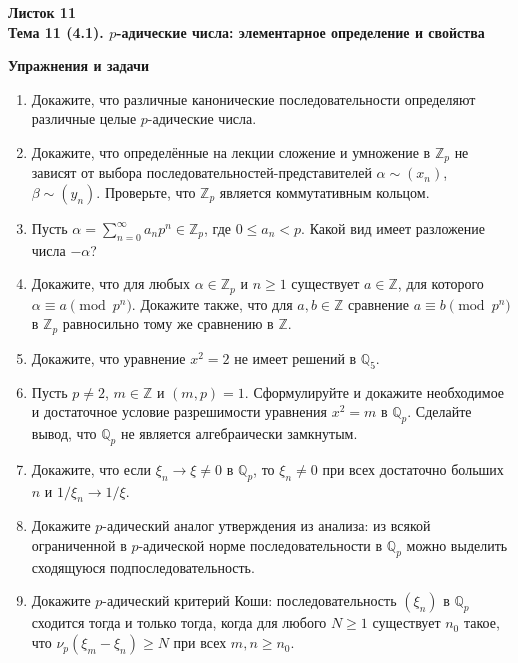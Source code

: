 \documentclass[a4paper, 11pt]{article}
\begin{document}
\begin{center} \Large\bfseries Листок 11\\ Тема 11 (4.1). $p$-адические числа: элементарное определение и свойства \end{center}

\noindent\textbf{Упражнения и задачи}

\begin{enumerate}[topsep=0pt]

    \item Докажите, что различные канонические последовательности определяют различные целые $p$-адические числа. %

    \item Докажите, что определённые на лекции сложение и умножение в $\mathbb{Z}_p$ не зависят от выбора последовательностей-представителей $\alpha\sim(x_n)$, $\beta\sim(y_n)$. Проверьте, что $\mathbb{Z}_p$ является коммутативным кольцом. %

    \item Пусть $\alpha = \sum_{n=0}^{\infty} a_n p^n \in \mathbb{Z}_p$, где $0\le a_n<p$. Какой вид имеет разложение числа $-\alpha$? %

    \item Докажите, что для любых $\alpha\in\mathbb{Z}_p$ и $n\ge 1$ существует $a\in\mathbb{Z}$, для которого $\alpha\equiv a\pmod{p^n}$. Докажите также, что для $a,b\in\mathbb{Z}$ сравнение $a\equiv b\pmod{p^n}$ в $\mathbb{Z}_p$ равносильно тому же сравнению в $\mathbb{Z}$. %

    \item Докажите, что уравнение $x^2=2$ не имеет решений в $\mathbb{Q}_5$.

    \item Пусть $p\neq 2$, $m\in\mathbb{Z}$ и $(m,p)=1$. Сформулируйте и докажите необходимое и достаточное условие разрешимости уравнения $x^2=m$ в $\mathbb{Q}_p$. Сделайте вывод, что $\mathbb{Q}_p$ не является алгебраически замкнутым.

    \item Докажите, что если $\xi_n\to\xi\neq 0$ в $\mathbb{Q}_p$, то $\xi_n\neq 0$ при всех достаточно больших $n$ и $1/\xi_n\to 1/\xi$. %

    \item Докажите $p$-адический аналог утверждения из анализа: из всякой ограниченной в $p$-адической норме последовательности в $\mathbb{Q}_p$ можно выделить сходящуюся подпоследовательность. %

    \item Докажите $p$-адический критерий Коши: последовательность $(\xi_n)$ в $\mathbb{Q}_p$ сходится тогда и только тогда, когда для любого $N\ge 1$ существует $n_0$ такое, что $\nu_p(\xi_m-\xi_n)\ge N$ при всех $m,n\ge n_0$. %


\end{enumerate}
\end{document}
